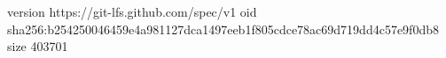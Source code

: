 version https://git-lfs.github.com/spec/v1
oid sha256:b254250046459e4a981127dca1497eeb1f805cdce78ac69d719dd4c57e9f0db8
size 403701
